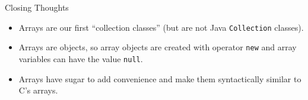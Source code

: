 \documentclass{beamer}
\begin{document}




%
%
%
%
%
%
%

\begin{frame}[fragile]{Closing Thoughts}

\begin{itemize}
\item Arrays are our first ``collection classes'' (but are not Java {\tt Collection} classes).
\item Arrays are objects, so array objects are created with operator {\tt new} and array variables can have the value {\tt null}.
\item Arrays have sugar to add convenience and make them syntactically similar to C's arrays.
\end{itemize}


\end{frame}
\end{document}
